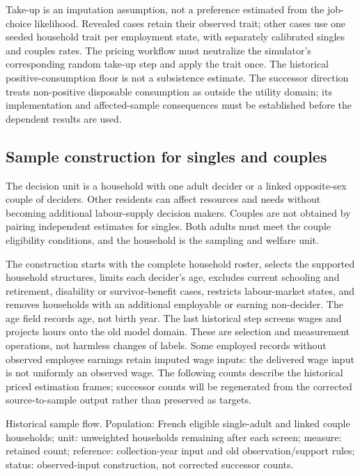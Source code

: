 \documentclass[11pt,a4paper]{article}
\begin{document}
Take-up is an imputation assumption, not a preference estimated from the job-choice likelihood. Revealed cases retain their observed trait; other cases use one seeded household trait per employment state, with separately calibrated singles and couples rates. The pricing workflow must neutralize the simulator's corresponding random take-up step and apply the trait once. The historical positive-consumption floor is not a subsistence estimate. The successor direction treats non-positive disposable consumption as outside the utility domain; its implementation and affected-sample consequences must be established before the dependent results are used.

\subsection{Sample construction for singles and couples}\label{sample-construction-for-singles-and-couples}

The decision unit is a household with one adult decider or a linked opposite-sex couple of deciders. Other residents can affect resources and needs without becoming additional labour-supply decision makers. Couples are not obtained by pairing independent estimates for singles. Both adults must meet the couple eligibility conditions, and the household is the sampling and welfare unit.

The construction starts with the complete household roster, selects the supported household structures, limits each decider's age, excludes current schooling and retirement, disability or survivor-benefit cases, restricts labour-market states, and removes households with an additional employable or earning non-decider. The age field records age, not birth year. The last historical step screens wages and projects hours onto the old model domain. These are selection and measurement operations, not harmless changes of labels. Some employed records without observed employee earnings retain imputed wage inputs: the delivered wage input is not uniformly an observed wage. The following counts describe the historical priced estimation frames; successor counts will be regenerated from the corrected source-to-sample output rather than preserved as targets.

Historical sample flow. Population: French eligible single-adult and linked couple households; unit: unweighted households remaining after each screen; measure: retained count; reference: collection-year input and old observation/support rules; status: observed-input construction, not corrected successor counts.
\end{document}
